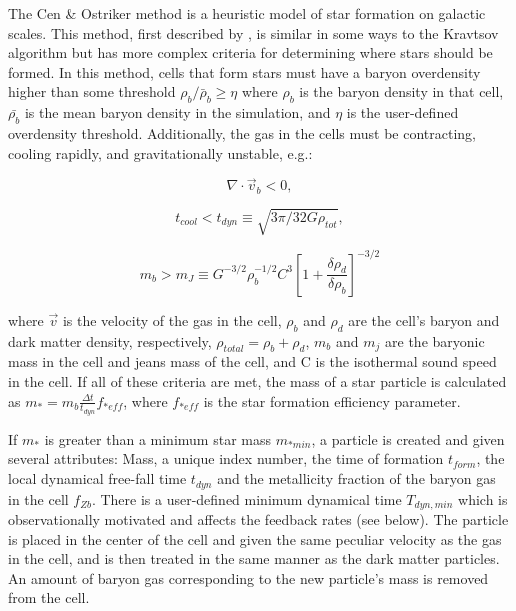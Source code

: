 
The Cen \& Ostriker method is a heuristic model of star formation
on galactic scales.  This method, first described by
\citet{1992ApJ...399L.113C}, is similar in some ways to the Kravtsov algorithm
but has more complex criteria for determining where stars should
be formed.  In this method, cells that form stars must have a 
baryon overdensity higher than some threshold 
$\rho_b/\bar{\rho}_b \geq \eta$ 
where $\rho_b$ is the baryon density in that cell, 
$\bar{\rho_b}$ is the mean baryon density in the simulation,
and $\eta$ is the user-defined overdensity threshold.
Additionally, the gas in the cells must be contracting, 
cooling rapidly, and gravitationally unstable, e.g.:

\begin{equation}
\nabla \cdot \vec{v}_b < 0,
\label{cencont}
\end{equation}

\begin{equation}
t_{cool} < t_{dyn} \equiv \sqrt{3 \pi / 32G \rho_{tot}},
\end{equation}

\begin{equation}
m_{b} > m_{J} \equiv G^{-3/2} \rho_{b}^{-1/2}C^{3}
\left[ 1 + \frac{\delta\rho_{d}}{\delta\rho_{b}} \right]^{-3/2}
\end{equation}

where $\vec{v}$ is the velocity of the gas in the cell, $\rho_{b}$ and 
$\rho_{d}$ are the cell's baryon and dark matter density, respectively,
$\rho_{total} = \rho_{b} + \rho_{d}$, $m_{b}$ and $m_{j}$ are the 
baryonic mass in the cell and jeans mass of the cell, and C is the 
isothermal sound speed in the cell.  
If all of these criteria are met, 
the mass of a star particle is calculated as \(m_{*} = m_{b} 
\frac{ \Delta t}{ t_{dyn} } f_{*eff} \), 
where $f_{*eff}$ is the star formation efficiency parameter.

If $m_{*}$ is greater than a minimum star mass $m_{*min}$, a particle 
is created and given several attributes:  Mass, a unique index number, 
the time of formation $t_{form}$, the local dynamical free-fall time 
$t_{dyn}$ and the metallicity fraction of the baryon gas in the cell 
$f_{Zb}$.  There is a user-defined minimum dynamical time
$T_{dyn,min}$ which is observationally motivated and affects the
feedback rates (see below).
The particle is placed in the center of the cell and given 
the same peculiar velocity as the gas in the cell, and is then treated 
in the same manner as the dark matter particles.  An 
amount of baryon gas corresponding to the new particle's mass is 
removed from the cell.  

